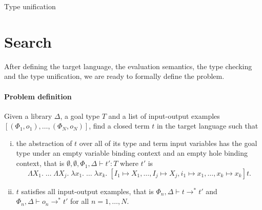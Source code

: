 \begin{algorithm}
\caption{Type unification\label{alg:type unification}}

\end{algorithm} 

\section{Search}
After defining the target language, the evaluation semantics, the type checking and the type unification, we are ready to formally define the problem.

\paragraph{Problem definition} Given a library $\Delta$, a goal type $T$ and a list of input-output examples $[(\Phi_1, o_1), \ldots , (\Phi_N, o_N)]$, find a closed term $t$ in the target language such that
\begin{enumerate}[(i)]
\item the abstraction of $t$ over all of its type and term input variables has the goal type under an empty variable binding context and an empty hole binding context, that is $\emptyset, \emptyset, \Phi_1, \Delta \vdash t' : T$ where $t'$ is \[\Lambda X_1.\; \ldots\; \Lambda X_j.\; \lambda x_1.\; \ldots\; \lambda x_k.\; [I_1 \mapsto X_1, \ldots, I_j \mapsto X_j, i_1 \mapsto x_1, \ldots, x_k \mapsto x_k]t.\]
\item $t$ satisfies all input-output examples, that is $\Phi_n, \Delta \vdash t \longrightarrow^* t'$ and $\Phi_n, \Delta \vdash o_n \longrightarrow^* t'$ for all $n = 1, \ldots, N$.
\end{enumerate}

